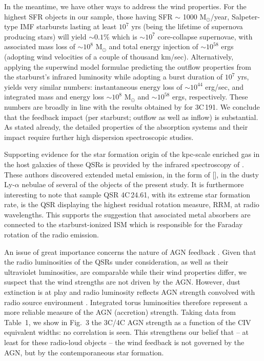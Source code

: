\documentclass[preprint]{aastex}
\begin{document}
In the meantime, we have other ways to address the wind properties.  For
the highest SFR objects in our sample, those having SFR $\sim$ 1000
M$_{\odot}$/year, Salpeter-type IMF starbursts lasting at least $10^7$
yrs (being the lifetime of supernova producing stars) will yield
\citep{woosley86} $\sim 0.1\%$ which is $\sim 10^7$ core-collapse
supernovae, with associated mass loss of $\sim 10^8$ M$_{\odot}$ and
total energy injection of $\sim 10^{58}$ ergs (adopting wind velocities
of a couple of thousand km/sec).  Alternatively, applying the superwind
model formulae \citep{heckman90} predicting the outflow properties from
the starburst's infrared luminosity while adopting a burst duration of
$10^7$ yrs, yields very similar numbers: instantaneous energy loss of
$\sim 10^{44}$ erg/sec, and integrated mass and energy loss $\sim 10^8$
M$_{\odot}$ and $\sim 10^{58}$ ergs, respectively.  These numbers are
broadly in line with the results obtained by \citet{hamann01} for
3C\,191.  We conclude that the feedback impact (per starburst; outflow
as well as inflow) is substantial.  As stated already, the detailed
properties of the absorption systems and their impact require further
high dispersion spectroscopic studies.  

Supporting evidence for the star formation origin of the kpc-scale
enriched gas in the host galaxies of these QSRs is provided by the
infrared spectroscopy of \citet{wilman00}.  These authors discovered
extended metal emission, in the form of [], in the dusty 
Ly-$\alpha$ nebulae of several of the objects of the present study.
It is furthermore interesting to note that sample QSR 4C\,24.61, with
its extreme star formation rate, is the QSR displaying the highest
\citep{kronberg82} residual rotation measure, RRM, at radio wavelengths. 
This supports the suggestion \citep{watson91} that associated metal
absorbers are connected to the starburst-ionized ISM which is
responsible for the Faraday rotation of the radio emission. 

An issue of great importance concerns the nature of AGN feedback
\citep[e.g.,][]{fabian12}.  Given that the radio luminosities of the
QSRs under consideration, as well as their ultraviolet luminosities, are
comparable while their wind properties differ, we suspect that the wind
strengths are not driven by the AGN.  However, dust extinction is at
play and radio luminosity reflects AGN strength convolved with radio
source environment \citep[e.g.,][]{ba96}.  Integrated torus luminosities
therefore represent a more reliable measure of the AGN (accretion)
strength.  Taking data from Table~1, we show in Fig.~3 the 3C/4C AGN
strength as a function of the CIV equivalent widths: no correlation is
seen.  This strengthens our belief that -- at least for these radio-loud
objects -- the wind feedback is not governed by the AGN, but by the
contemporaneous star formation. 
\end{document}
